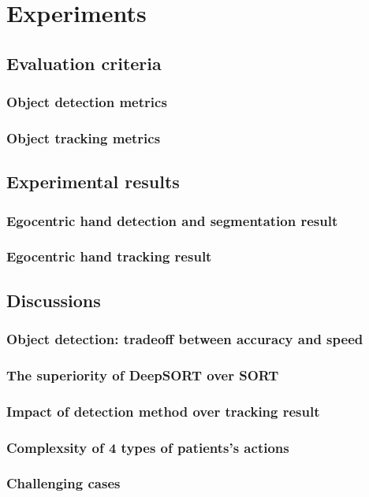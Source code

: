 \chapter{Experiments}\label{chap:exp}

\section{Evaluation criteria} \label{sec:evacri}
\subsection{Object detection metrics}
\subsection{Object tracking metrics}
\section{Experimental results}
\subsection{Egocentric hand detection and segmentation result}
\subsection{Egocentric hand tracking result}
\section{Discussions}
\subsection{Object detection: tradeoff between accuracy and speed}
\subsection{The superiority of DeepSORT over SORT}
\subsection{Impact of detection method over tracking result}
\subsection{Complexsity of 4 types of patients's actions}
\subsection{Challenging cases}